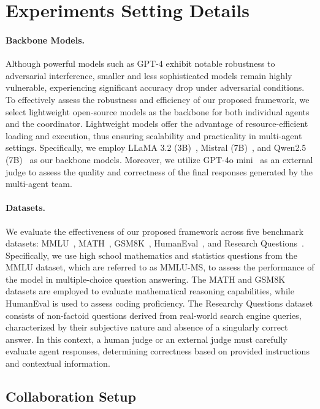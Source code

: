 \section{Experiments Setting Details}\label{app:exp-details}

\paragraph{Backbone Models.} Although powerful models such as GPT-4 exhibit notable robustness to adversarial interference, smaller and less sophisticated models remain highly vulnerable, experiencing significant accuracy drop under adversarial conditions. To effectively assess the robustness and efficiency of our proposed framework, we select lightweight open-source models as the backbone for both individual agents and the coordinator. Lightweight models offer the advantage of resource-efficient loading and execution, thus ensuring scalability and practicality in multi-agent settings. Specifically, we employ LLaMA 3.2 (3B)~\cite{llama3.2}, Mistral (7B)~\cite{mistral7b}, and Qwen2.5 (7B)~\cite{qwen2.5} as our backbone models.
Moreover, we utilize GPT-4o mini~\cite{gpt4o-mini} as an external judge to assess the quality and correctness of the final responses generated by the multi-agent team.


\paragraph{Datasets.} We evaluate the effectiveness of our proposed framework across five benchmark datasets: MMLU~\cite{MMLU}, MATH~\cite{math}, GSM8K~\cite{gsm8k}, HumanEval~\cite{humaneval}, and Research Questions~\cite{researchQA}. Specifically, we use high school mathematics and statistics questions from the MMLU dataset, which are referred to as MMLU-MS, to assess the performance of the model in multiple-choice question answering. The MATH and GSM8K datasets are employed to evaluate mathematical reasoning capabilities, while HumanEval is used to assess coding proficiency. The Researchy Questions dataset consists of non-factoid questions derived from real-world search engine queries, characterized by their subjective nature and absence of a singularly correct answer. In this context, a human judge or an external judge must carefully evaluate agent responses, determining correctness based on provided instructions and contextual information. 

\subsection{Collaboration Setup}

